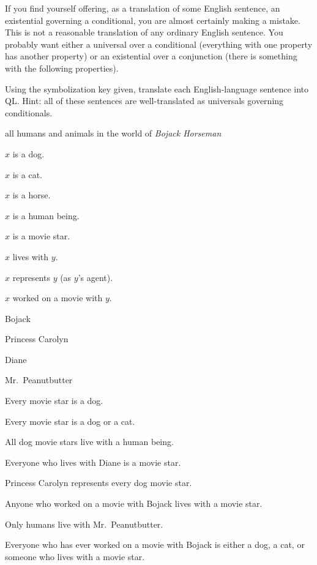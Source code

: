 If you find yourself offering, as a translation of some English sentence, an existential governing a conditional, you are almost certainly making a mistake. This is not a reasonable translation of any ordinary English sentence. You probably want either a universal over a conditional (everything with one property has another property) or an existential over a conjunction (there is something with the following properties). 

\practiceproblems

\problempart
\label{pr.QLbojackall}
Using the symbolization key given, translate each English-language sentence into QL. Hint: all of these sentences are well-translated as universals governing conditionals.
\begin{ekey}
\item[UD:] all humans and animals in the world of \emph{Bojack Horseman}
\item[Dx:] $x$ is a dog.
\item[Cx:] $x$ is a cat.
\item[Hx:] $x$ is a horse.
\item[Bx:] $x$ is a human being.
\item[Mx:] $x$ is a movie star.
\item[Lxy:] $x$ lives with $y$.
\item[Rxy:] $x$ represents $y$ (as $y$'s agent).
\item[Wxy:] $x$ worked on a movie with $y$.
\item[b:] Bojack
\item[c:] Princess Carolyn
\item[d:] Diane
\item[p:] Mr.\ Peanutbutter
\end{ekey}
\begin{earg}
\item Every movie star is a dog.
\item Every movie star is a dog or a cat.
\item All dog movie stars live with a human being.
\item Everyone who lives with Diane is a movie star.
\item Princess Carolyn represents every dog movie star.
\item Anyone who worked on a movie with Bojack lives with a movie star.
\item Only humans live with Mr.\ Peanutbutter.
\item Everyone who has ever worked on a movie with Bojack is either a dog, a cat, or someone who lives with a movie star.
\end{earg}

